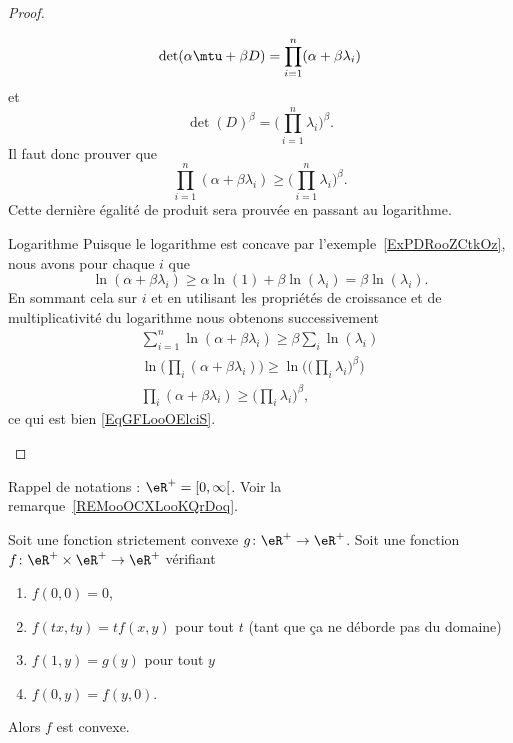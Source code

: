 \begin{proof}
\begin{subproof}
            \begin{equation}
                \det(\alpha\mtu+\beta D)=\prod_{i=1}^n(\alpha+\beta\lambda_i)
            \end{equation}
            et
            \begin{equation}
                \det(D)^{\beta}=\big( \prod_{i=1}^{n}\lambda_i \big)^{\beta}.
            \end{equation}
            Il faut donc prouver que
            \begin{equation}\label{EqGFLooOElciS}
                \prod_{i=1}^n(\alpha+\beta\lambda_i)\geq \big( \prod_{i=1}^n\lambda_i \big)^{\beta}.
            \end{equation}
            Cette dernière égalité de produit sera prouvée en passant au logarithme.
        \item[Logarithme]
            Puisque le logarithme est concave par l'exemple~\ref{ExPDRooZCtkOz}, nous avons pour chaque \( i\) que
            \begin{equation}
                \ln(\alpha+\beta\lambda_i)\geq \alpha\ln(1)+\beta\ln(\lambda_i)=\beta\ln(\lambda_i).
            \end{equation}
            En sommant cela sur \( i\) et en utilisant les propriétés de croissance et de multiplicativité du logarithme nous obtenons successivement
            \begin{subequations}
                \begin{align}
                    \sum_{i=1}^n\ln(\alpha+\beta\lambda_i)\geq \beta\sum_i\ln(\lambda_i)\\
                    \ln\big( \prod_i(\alpha+\beta\lambda_i) \big)\geq\ln\Big( \big( \prod_i\lambda_i \big)^{\beta} \Big)\\
                    \prod_i(\alpha+\beta\lambda_i)\geq\big( \prod_i\lambda_i \big)^{\beta},
                \end{align}
            \end{subequations}
            ce qui est bien \eqref{EqGFLooOElciS}.
    \end{subproof}
\end{proof}

Rappel de notations : \( \eR^+=\mathopen[ 0 , \infty \mathclose[\). Voir la remarque~\ref{REMooOCXLooKQrDoq}.
\begin{lemma}        \label{LEMooNUDOooVfVPkw}
    Soit une fonction strictement convexe \( g\colon \eR^+\to \eR^+\). Soit une fonction \( f\colon \eR^+\times \eR^+\to \eR^+\) vérifiant
    \begin{enumerate}
        \item
            \( f(0,0)=0\),
        \item
            \( f(tx,ty)=tf(x,y)\) pour tout \( t\) (tant que ça ne déborde pas du domaine)
        \item
            \( f(1,y)=g(y)\) pour tout \( y\)
        \item
            \( f(0,y)=f(y,0)\).
    \end{enumerate}
    Alors \( f\) est convexe.
\end{lemma}

